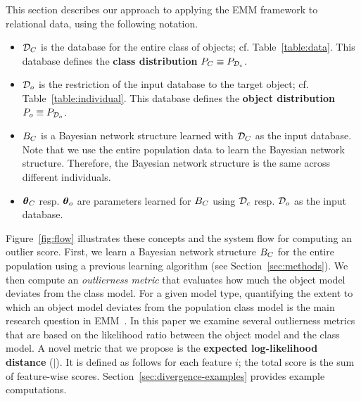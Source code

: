 {This section describes our approach to applying the EMM framework to relational data, using the following notation.
%
\begin{itemize}
	\item $\mathcal{D}_{C}$ is the database for the entire class of objects; cf. Table~\ref{table:data}. This database defines the \textbf{class distribution} $P_{C} \equiv P_{\mathcal{D}_{c}}$.
	\item $\mathcal{D}_{o}$ is the restriction of the input database to the target object; cf. Table~\ref{table:individual}. This database defines the \textbf{object distribution} $P_{o} \equiv P_{\mathcal{D}_{o}}$.
	\item $B_{C}$ is a Bayesian network structure learned with $\mathcal{D}_{C}$ as the input database. Note that we use the entire population data to learn the Bayesian network structure. Therefore, the Bayesian network structure is the same across different individuals.
	\item $\boldsymbol{\theta}_{C}$ resp. $\boldsymbol{\theta}_{o}$ are parameters learned for $B_{C}$ using $\mathcal{D}_{c}$ resp. $\mathcal{D}_{o}$ as the input database.
\end{itemize}

Figure~\ref{fig:flow} illustrates these concepts and the system flow for computing an outlier score. First, we learn a Bayesian network structure $B_{C}$ for the entire population using a previous learning algorithm (see Section~\ref{sec:methods}). We then compute an {\em outlierness metric} that evaluates how much the object model deviates from the class model. 
%
%
For a given model type, quantifying the extent to which an object model deviates from the population class model is the main research question in EMM~\citep{Duivesteijn2016}. In this paper we examine several outlierness metrics that are based on the likelihood ratio between the object model and the class model. 
A novel metric that we propose is the \textbf{expected log-likelihood distance} ($\mid$). It is defined as follows for each feature $i$; the total score is the sum of feature-wise scores. Section~\ref{sec:divergence-examples}  provides example computations.


}
